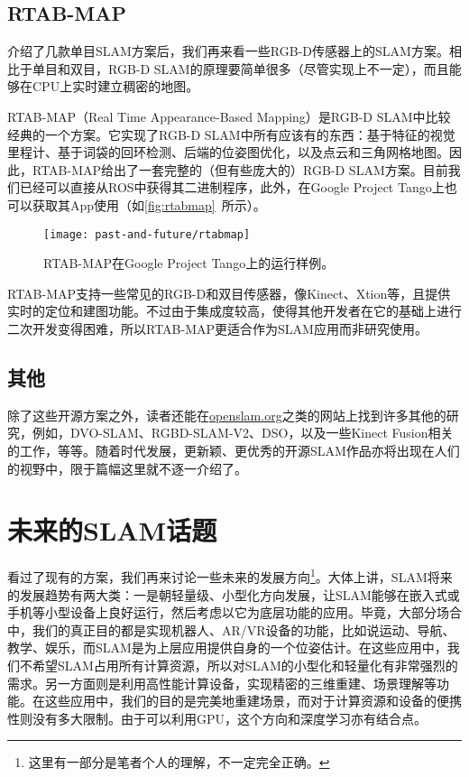\subsection{RTAB-MAP}

介绍了几款单目SLAM方案后，我们再来看一些RGB-D传感器上的SLAM方案。相比于单目和双目，RGB-D SLAM的原理要简单很多（尽管实现上不一定），而且能够在CPU上实时建立稠密的地图。

RTAB-MAP（Real Time Appearance-Based Mapping）\textsuperscript{\cite{Labbe2014}}是RGB-D SLAM中比较经典的一个方案。它实现了RGB-D SLAM中所有应该有的东西：基于特征的视觉里程计、基于词袋的回环检测、后端的位姿图优化，以及点云和三角网格地图。因此，RTAB-MAP给出了一套完整的（但有些庞大的）RGB-D SLAM方案。目前我们已经可以直接从ROS中获得其二进制程序，此外，在Google Project Tango上也可以获取其App使用（如\autoref{fig:rtabmap}~所示）。

\begin{figure}[!ht]
	\centering
	\texttt{[image: past-and-future/rtabmap]}
	\caption{RTAB-MAP在Google Project Tango上的运行样例。}
	\label{fig:rtabmap}
\end{figure}

RTAB-MAP支持一些常见的RGB-D和双目传感器，像Kinect、Xtion等，且提供实时的定位和建图功能。不过由于集成度较高，使得其他开发者在它的基础上进行二次开发变得困难，所以RTAB-MAP更适合作为SLAM应用而非研究使用。

\subsection{其他}
除了这些开源方案之外，读者还能在\url{openslam.org}之类的网站上找到许多其他的研究，例如，DVO-SLAM\textsuperscript{\cite{Kerl2013a}}、RGBD-SLAM-V2\textsuperscript{\cite{Endres2014}}、DSO\textsuperscript{\cite{Engel2016}}，以及一些Kinect Fusion相关的工作，等等。随着时代发展，更新颖、更优秀的开源SLAM作品亦将出现在人们的视野中，限于篇幅这里就不逐一介绍了。
	

\section{未来的SLAM话题}
看过了现有的方案，我们再来讨论一些未来的发展方向\footnote{这里有一部分是笔者个人的理解，不一定完全正确。}。大体上讲，SLAM将来的发展趋势有两大类：一是朝轻量级、小型化方向发展，让SLAM能够在嵌入式或手机等小型设备上良好运行，然后考虑以它为底层功能的应用。毕竟，大部分场合中，我们的真正目的都是实现机器人、AR/VR设备的功能，比如说运动、导航、教学、娱乐，而SLAM是为上层应用提供自身的一个位姿估计。在这些应用中，我们不希望SLAM占用所有计算资源，所以对SLAM的小型化和轻量化有非常强烈的需求。另一方面则是利用高性能计算设备，实现精密的三维重建、场景理解等功能。在这些应用中，我们的目的是完美地重建场景，而对于计算资源和设备的便携性则没有多大限制。由于可以利用GPU，这个方向和深度学习亦有结合点。

